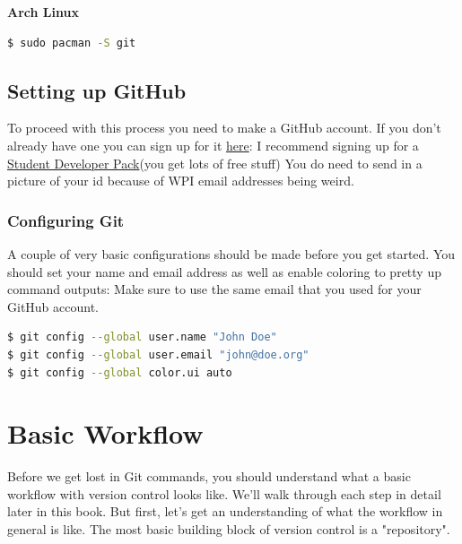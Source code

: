 \documentclass{article}
\begin{document}
\textbf{Arch Linux}
\begin{lstlisting}[language=bash]
$ sudo pacman -S git
\end{lstlisting}

\subsection{Setting up GitHub}

To proceed with this process you need to make a GitHub account. 
\newline\newline
If you don't already have one you can sign up for it \href{https://github.com/join?source=header-home}{here}:
\newline\newline
I recommend signing up for a \href{https://education.github.com/pack}{Student Developer Pack}(you get lots of free stuff)
\newline\newline
You do need to send in a picture of your id because of WPI email addresses being weird.

\subsubsection{Configuring Git}
A couple of very basic configurations should be made before you get started. You should set your name and email address as well as enable coloring to pretty up command outputs:
\newline\newline
Make sure to use the same email that you used for your GitHub account.

\begin{lstlisting}[language=bash]
$ git config --global user.name "John Doe"
$ git config --global user.email "john@doe.org"
$ git config --global color.ui auto
\end{lstlisting}

\section{Basic Workflow}

Before we get lost in Git commands, you should understand what a basic workflow with version control looks like. We'll walk through each step in detail later in this book. But first, let's get an understanding of what the workflow in general is like.
\newline\newline
The most basic building block of version control is a "repository".
\end{document}
